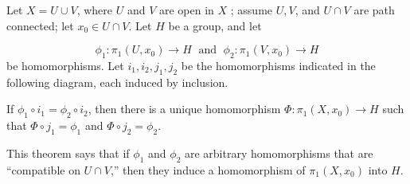 \begin{theorem}
\label{thm:\thetheorem}
Let \(X = U \cup V\), where \(U\) and \(V\) are open in \(X\) ; assume \(U,V\), and \(U \cap V\) are path connected; let \(x_{0} \in U \cap V\). Let \(H\) be a group, and let

\[
{\phi }_{1} : {\pi }_{1}( {U,x_{0}}) \rightarrow H\;\text{ and }\;{\phi }_{2} : {\pi }_{1}( {V,x_{0}}) \rightarrow H
\]
be homomorphisms. Let \(i_{1},i_{2},j_{1},j_{2}\) be the homomorphisms indicated in the following diagram, each induced by inclusion.

\par\nopagebreak
\begin{center}
	\label{fig:com_70_00}
\end{center}
\par\nopagebreak 

If \({\phi }_{1} \circ {i}_{1} = {\phi }_{2} \circ {i}_{2}\), then there is a unique homomorphism \(\Phi : {\pi }_{1}( {X,x_{0}}) \rightarrow H\) such that \(\Phi \circ {j}_{1} = {\phi }_{1}\) and \(\Phi \circ {j}_{2} = {\phi }_{2}\).

This theorem says that if \({\phi }_{1}\) and \({\phi }_{2}\) are arbitrary homomorphisms that are ``compatible on \(U \cap V\),'' then they induce a homomorphism of \({\pi }_{1}( {X,x_{0}})\) into \(H\).
\end{theorem}

